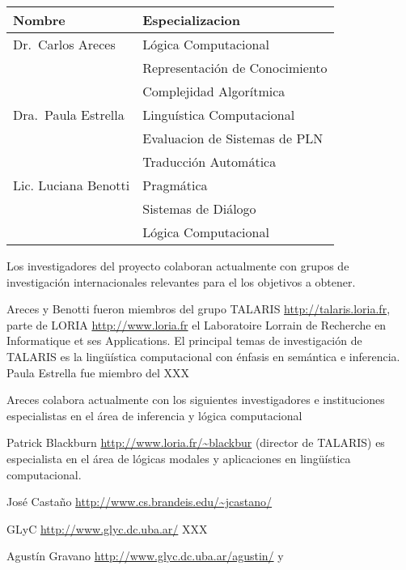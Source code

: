 
\begin{center}\small
    \begin{minipage}{\linewidth}
        \begin{center}
        \begin{tabular}{|l|l|}
        \hline\hline
        Nombre &  Especializacion \\
        \hline
        Dr.\ Carlos Areces &
          L\'ogica Computacional\\
        & Representaci\'on de Conocimiento\\
        & Complejidad Algor\'itmica
      \\ \hline
        Dra.\ Paula Estrella &
          Lingu\'istica Computacional \\
        & Evaluacion de Sistemas de PLN
      \\
		& Traducci\'on Autom\'atica \\ \hline
        Lic. Luciana Benotti &
          Pragm\'atica \\
        & Sistemas de Di\'alogo\\
        & L\'ogica Computacional\\
        \hline\hline
        \end{tabular}
        \end{center}
    \end{minipage}
\end{center}


Los investigadores del proyecto colaboran actualmente
con grupos de investigaci\'on internacionales relevantes para
el los objetivos a obtener.

Areces y Benotti fueron miembros
del grupo TALARIS \url{http://talaris.loria.fr}, parte de
LORIA \url{http://www.loria.fr} el Laboratoire Lorrain de Recherche en Informatique et ses Applications. El principal temas de investigaci\'on de TALARIS es la ling\"u\'istica
computacional con \'enfasis en sem\'antica e inferencia.  Paula Estrella
fue miembro del XXX 

Areces colabora actualmente con los siguientes investigadores e instituciones especialistas en el \'area de inferencia y l\'ogica
computacional
\begin{myitemize}
\item Patrick Blackburn \url{http://www.loria.fr/~blackbur} (director de TALARIS) es especialista en el \'area de l\'ogicas modales y aplicaciones
en ling\"u\'istica computacional.

\item Jos\'e Casta\~no \url{http://www.cs.brandeis.edu/~jcastano/}

\item GLyC \url{http://www.glyc.dc.uba.ar/} XXX

\item Agust\'in Gravano \url{http://www.glyc.dc.uba.ar/agustin/} y
\end{myitemize}



